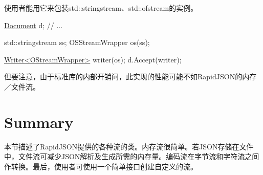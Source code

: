 使用者能用它来包装{\ttfamily std\+::stringstream}、{\ttfamily std\+::ofstream}的实例。


\begin{DoxyCode}
\hyperlink{class_generic_document}{Document} d;
\textcolor{comment}{// ...}

std::stringstream ss;
OSStreamWrapper os(ss);

\hyperlink{class_writer}{Writer<OStreamWrapper>} writer(os);
d.Accept(writer);
\end{DoxyCode}


但要注意，由于标准库的内部开销问，此实现的性能可能不如\+Rapid\+J\+S\+O\+N的内存／文件流。\hypertarget{md_Cadriciel_Commun_Externe_RapidJSON_doc_stream.zh-cn_Summary}{}\section{Summary}\label{md_Cadriciel_Commun_Externe_RapidJSON_doc_stream.zh-cn_Summary}
本节描述了\+Rapid\+J\+S\+O\+N提供的各种流的类。内存流很简单。若\+J\+S\+O\+N存储在文件中，文件流可减少\+J\+S\+O\+N解析及生成所需的内存量。编码流在字节流和字符流之间作转换。最后，使用者可使用一个简单接口创建自定义的流。 